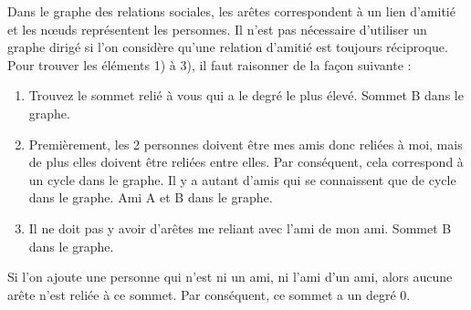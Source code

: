 \begin{Exercice}[10 minutes]
    \begin{solution}
        Dans le graphe des relations sociales, les arêtes correspondent à un lien d'amitié et les nœuds représentent les personnes. Il n'est pas nécessaire d'utiliser un graphe dirigé si l'on considère qu'une relation d'amitié est toujours réciproque.\\
        
        Pour trouver les éléments 1) à 3), il faut raisonner de la façon suivante :
        \begin{enumerate}
            \item Trouvez le sommet relié à vous qui a le degré le plus élevé. Sommet B dans le graphe.
            \item Premièrement, les 2 personnes doivent être mes amis donc reliées à moi, mais de  plus elles doivent être reliées entre elles. Par conséquent, cela correspond à un cycle dans le graphe. Il y a autant d'amis qui se connaissent que de cycle dans le graphe. Ami A et B dans le graphe.
            \item Il ne doit pas y avoir d'arêtes me reliant avec l'ami de mon ami. Sommet B dans le graphe.
        \end{enumerate}
        
        Si l'on ajoute une personne qui n'est ni un ami, ni l'ami d'un ami, alors aucune arête n'est reliée à ce sommet. Par conséquent, ce sommet a un degré 0.
    \end{solution} 
\end{Exercice}

